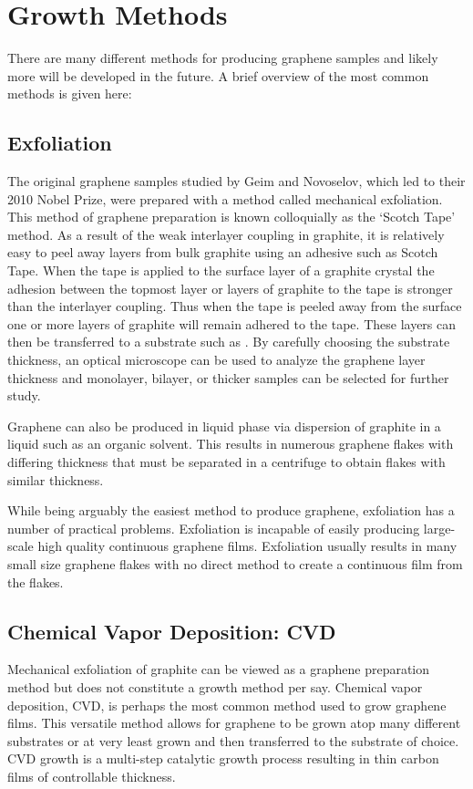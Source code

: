 \section{Growth Methods}
There are many different methods for producing graphene samples and likely more will be developed in the future. A brief overview of the most common methods is given here:
  \subsection{Exfoliation}
  The original graphene samples studied by Geim and Novoselov, which led to their 2010 Nobel Prize, were prepared with a method called mechanical exfoliation. This method of graphene preparation is known colloquially as the `Scotch Tape' method. As a result of the weak interlayer coupling in graphite, it is relatively easy to peel away layers from bulk graphite using an adhesive such as Scotch Tape. When the tape is applied to the surface layer of a graphite crystal the adhesion between the topmost layer or layers of graphite to the tape is stronger than the interlayer coupling. Thus when the tape is peeled away from the surface one or more layers of graphite will remain adhered to the tape. These layers can then be transferred to a substrate such as . By carefully choosing the substrate thickness, an optical microscope can be used to analyze the graphene layer thickness and monolayer, bilayer, or thicker samples can be selected for further study.

Graphene can also be produced in liquid phase via dispersion of graphite in a liquid such as an organic solvent. This results in numerous graphene flakes with differing thickness that must be separated in a centrifuge to obtain flakes with similar thickness.

While being arguably the easiest method to produce graphene, exfoliation has a number of practical problems. Exfoliation is incapable of easily producing large-scale high quality continuous graphene films. Exfoliation usually results in many small size graphene flakes with no direct method to create a continuous film from the flakes.
  \subsection{Chemical Vapor Deposition: CVD}
  Mechanical exfoliation of graphite can be viewed as a graphene preparation method but does not constitute a growth method per say. Chemical vapor deposition, CVD, is perhaps the most common method used to grow graphene films. This versatile method allows for graphene to be grown atop many different substrates or at very least grown and then transferred to the substrate of choice. CVD growth is a multi-step catalytic growth process resulting in thin carbon films of controllable thickness.

